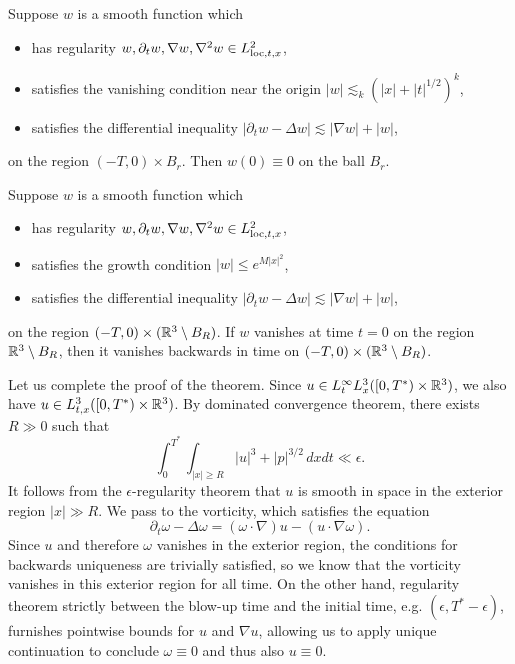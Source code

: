 \begin{proposition}\label{prop:unique1}
	Suppose $w$ is a smooth function which 
		\begin{itemize}
			\item has regularity $w, \partial_t w, \nabla w, \nabla^2 w \in L^2_{\mathrm{loc}, t, x}$, 
			
			\item satisfies the vanishing condition near the origin $|w| \lesssim_k (|x| + |t|^{1/2})^k$, 
			
			\item satisfies the differential inequality $|\partial_t w - \Delta w| \lesssim |\nabla w| + |w|$, 
		\end{itemize}
	on the region $(-T, 0) \times B_r$. Then $w(0) \equiv 0$ on the ball $B_r$. 
\end{proposition}

\begin{proposition}\label{prop:backunique1}
	Suppose $w$ is a smooth function which
		\begin{itemize}
			\item has regularity $w, \partial_t w, \nabla w, \nabla^2 w \in L^2_{\mathrm{loc}, t, x}$, 
			\item satisfies the growth condition $|w| \leq e^{M |x|^2}$, 
			\item satisfies the differential inequality $|\partial_t w - \Delta w| \lesssim |\nabla w| + |w|$,  
		\end{itemize}
	on the region $(-T, 0) \times (\mathbb R^3 \setminus B_R)$. If $w$ vanishes at time $t = 0$ on the region $\mathbb R^3 \setminus B_R$, then it vanishes backwards in time on $(-T, 0) \times (\mathbb R^3 \setminus B_R)$. 
\end{proposition}

Let us complete the proof of the theorem. Since $u \in L^\infty_t L^3_x ([0, T^*) \times \mathbb R^3)$, we also have $u \in L^3_{t, x} ([0, T^*) \times \mathbb R^3)$. By dominated convergence theorem, there exists $R \gg 0$ such that 
	\[
		\int_0^{T^*} \int_{|x| \geq R} |u|^3 + |p|^{3/2} \, dx dt \ll \epsilon.
	\]
It follows from the $\epsilon$-regularity theorem that $u$ is smooth in space in the exterior region $|x| \gg R$. We pass to the vorticity, which satisfies the equation 
	\[
		\partial_t \omega - \Delta \omega = (\omega \cdot \nabla) u - (u \cdot \nabla \omega). 
	\]
Since $u$ and therefore $\omega$ vanishes in the exterior region, the conditions for backwards uniqueness are trivially satisfied, so we know that the vorticity vanishes in this exterior region for all time. On the other hand, regularity theorem strictly between the blow-up time and the initial time, e.g. $(\epsilon, T^* - \epsilon)$, furnishes pointwise bounds for $u$ and $\nabla u$, allowing us to apply unique continuation to conclude $\omega \equiv 0$ and thus also $u \equiv 0$. 

